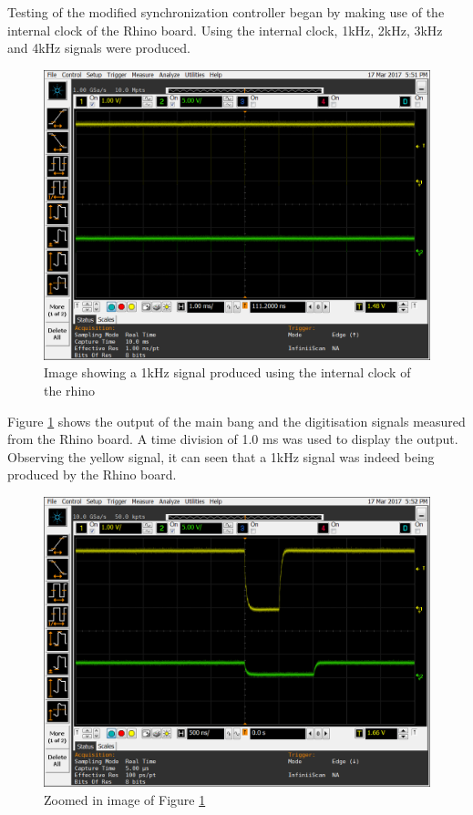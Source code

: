 \documentclass[12pt, a4paper]{article}
\begin{document}
Testing of the modified synchronization controller began by making use of the internal clock of the Rhino board. Using the internal clock, 1kHz, 2kHz, 3kHz and 4kHz signals were produced. 

	\begin{figure}[h!]
		\centering
		\includegraphics[width=13cm]{1khz_mb_offset_500_ns}
		\caption{Image showing a 1kHz signal produced using the internal clock of the rhino}
		\label{fig:1kHz_in_500_offset}
	\end{figure}
	
Figure \ref{fig:1kHz_in_500_offset} shows the output of the main bang and the digitisation signals measured from the Rhino board. A time division of 1.0 ms was used to display the output. Observing the yellow signal, it can seen that a 1kHz signal was indeed being produced by the Rhino board.

	\begin{figure}[t]
		\centering
		\includegraphics[width=13cm]{1khz_mb_offset_500_ns_length_of_offset}
		\caption{Zoomed in image of Figure \ref{fig:1kHz_in_500_offset}}
		\label{fig:1kHz_in_500_offset_zoom}
	\end{figure}
		
\end{document}
